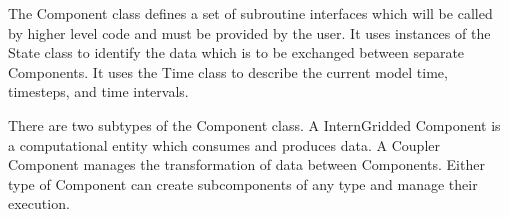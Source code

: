 %


The Component class defines a set of subroutine interfaces which
will be called by higher level code and must be provided by the user.
It uses instances of the State class to identify the data which is
to be exchanged between separate Components.  It uses the Time class
to describe the current model time, timesteps, and time intervals.


There are two subtypes of the Component class.  
A InternGridded Component is a computational entity which
consumes and produces data.  A Coupler Component manages the
transformation of data between Components.
Either type of Component can create subcomponents of any
type and manage their execution.


